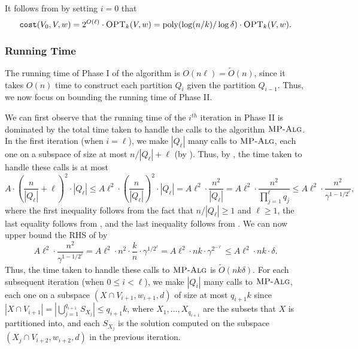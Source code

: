 \documentclass[11pt]{article}
\newcommand{\1}{\mathmybb{1}}
\DeclareMathOperator*{\poly}{poly}
\newcommand{\OPT}{\textsc{OPT}}
\newcommand{\cost}{\textnormal{\texttt{cost}}}
\newcommand{\MPAlg}{\textnormal{\textsc{MP-Alg}}}
\begin{document}
\noindent
It follows from  by setting $i=0$ that 
$$\cost(V_0, V, w) = 2^{O(\ell)} \cdot \OPT_k(V,w) = \poly (\log(n/k)/\log \delta) \cdot \OPT_k(V,w).$$

\subsubsection*{Running Time}

The running time of Phase I of the algorithm is $O(n \ell) = \tilde O(n)$, since it takes $O(n)$ time to construct each partition $Q_i$ given the partition $Q_{i-1}$. Thus, we now focus on bounding the running time of Phase II.


We can first observe that the running time of the $i^{th}$ iteration in Phase II is dominated by the total time taken to handle the calls to the algorithm $\MPAlg$.
In the first iteration (when $i = \ell$), we make $|Q_\ell|$ many calls to $\MPAlg$, each one on a subspace of size at most $n/|Q_\ell| + \ell$ (by ). Thus, by , the time taken to handle these calls is at most
\begin{equation}\label{eq:1}
A \cdot \left(\frac{n}{|Q_\ell|} + \ell\right)^2 \cdot |Q_\ell| \leq A \ell^2 \cdot  \left(\frac{n}{|Q_\ell|}\right)^2 \cdot |Q_\ell| = A \ell^2 \cdot  \frac{n^2}{|Q_\ell|} = A \ell^2 \cdot \frac{n^2}{\prod_{j=1}^\ell q_j} \leq A \ell^2 \cdot \frac{n^2}{\gamma^{1 - 1/2^\ell}}, 
\end{equation}
where the first inequality follows from the fact that $n/|Q_\ell| \geq 1$ and $\ell \geq 1$, the last equality follows from , and the last inequality follows from .
We can now upper bound the RHS of  by
\begin{equation}\label{eq:3}
A \ell^2 \cdot \frac{n^2}{\gamma^{1 - 1/2^\ell}} = A \ell^2 \cdot n^2 \cdot  \frac{k}{n} \cdot \gamma^{1/2^\ell} = A \ell^2 \cdot nk \cdot \gamma^{2^{-\ell}} \leq A \ell^2 \cdot nk \cdot \delta.  
\end{equation}
Thus, the time taken to handle these calls to $\MPAlg$ is $\tilde O(nk\delta)$.
For each subsequent iteration (when $0 \leq i < \ell$), we make $|Q_i|$ many calls to $\MPAlg$, 
each one on a subspace $(X \cap V_{i+1},w_{i+1},d)$ of size at most $q_{i+1} k$ since
$ |X \cap V_{i+1}| = | \bigcup_{j=1}^{q_{i+1}} S_{X_j}| \leq q_{i+1} k$,
where $X_1, \ldots, X_{q_{i+1}}$ are the subsets that $X$ is partitioned into, and each $S_{X_j}$ is the solution computed on the subspace $(X_j \cap V_{i+2}, w_{i+2},d)$ in the previous iteration.
\end{document}
